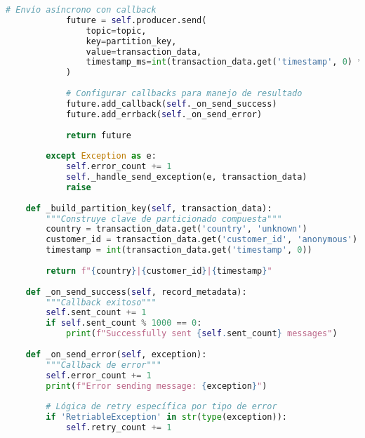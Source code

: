 \begin{lstlisting}[language=python, caption=Configuración de Productor con Garantías Estrictas, label=lst:producer_config]
            # Envío asíncrono con callback
            future = self.producer.send(
                topic=topic,
                key=partition_key,
                value=transaction_data,
                timestamp_ms=int(transaction_data.get('timestamp', 0) * 1000)
            )
            
            # Configurar callbacks para manejo de resultado
            future.add_callback(self._on_send_success)
            future.add_errback(self._on_send_error)
            
            return future
            
        except Exception as e:
            self.error_count += 1
            self._handle_send_exception(e, transaction_data)
            raise
    
    def _build_partition_key(self, transaction_data):
        """Construye clave de particionado compuesta"""
        country = transaction_data.get('country', 'unknown')
        customer_id = transaction_data.get('customer_id', 'anonymous') 
        timestamp = int(transaction_data.get('timestamp', 0))
        
        return f"{country}|{customer_id}|{timestamp}"
    
    def _on_send_success(self, record_metadata):
        """Callback exitoso"""
        self.sent_count += 1
        if self.sent_count % 1000 == 0:
            print(f"Successfully sent {self.sent_count} messages")
    
    def _on_send_error(self, exception):
        """Callback de error"""
        self.error_count += 1
        print(f"Error sending message: {exception}")
        
        # Lógica de retry específica por tipo de error
        if 'RetriableException' in str(type(exception)):
            self.retry_count += 1
\end{lstlisting} 